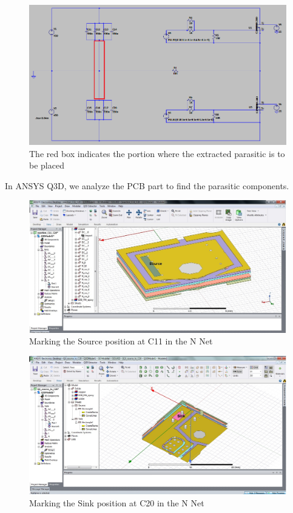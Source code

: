 \begin{figure} [H]
  \centering
  \includegraphics[width=\linewidth]{pictures/examples/spice4.png}
  \caption{The red box indicates the portion where the extracted parasitic is to be placed}
  \label{fig:spice4}
\end{figure}

In ANSYS Q3D, we analyze the PCB part to find the parasitic components.

\begin{figure} [H]
  \centering
  \includegraphics[width=\linewidth]{pictures/examples/c11_c20_source.png}
  \caption{Marking the Source position at C11 in the N Net}
  \label{fig:C11_C20_source}
\end{figure}

\begin{figure} [H]
  \centering
  \includegraphics[width=\linewidth]{pictures/examples/Q3S_C16_Sink.png}
  \caption{Marking the Sink position at C20 in the N Net}
  \label{fig:C11_C20_sink}
\end{figure}

